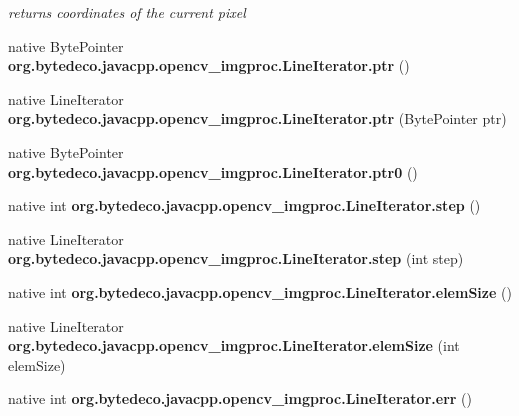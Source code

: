 \begin{DoxyCompactItemize}
\begin{DoxyCompactList}\small\item\em returns coordinates of the current pixel \end{DoxyCompactList}\item 
\mbox{\label{group__imgproc_ga25dc6ab71b5b93e0a3413227e2773826}} 
native Byte\+Pointer {\bfseries org.\+bytedeco.\+javacpp.\+opencv\+\_\+imgproc.\+Line\+Iterator.\+ptr} ()
\item 
\mbox{\label{group__imgproc_ga20f9ec09fb3f6f6ccf40193b347d0f7c}} 
native Line\+Iterator {\bfseries org.\+bytedeco.\+javacpp.\+opencv\+\_\+imgproc.\+Line\+Iterator.\+ptr} (Byte\+Pointer ptr)
\item 
\mbox{\label{group__imgproc_gad943660786a5905e1c46f535e955ef7c}} 
native Byte\+Pointer {\bfseries org.\+bytedeco.\+javacpp.\+opencv\+\_\+imgproc.\+Line\+Iterator.\+ptr0} ()
\item 
\mbox{\label{group__imgproc_gac4e82c4106fb6c949cc7b8beeedc3fe6}} 
native int {\bfseries org.\+bytedeco.\+javacpp.\+opencv\+\_\+imgproc.\+Line\+Iterator.\+step} ()
\item 
\mbox{\label{group__imgproc_ga37f140e72ae2e2263e885394b9f9b34b}} 
native Line\+Iterator {\bfseries org.\+bytedeco.\+javacpp.\+opencv\+\_\+imgproc.\+Line\+Iterator.\+step} (int step)
\item 
\mbox{\label{group__imgproc_gaaa21dc13f40e52f18c1beb09d4d617c0}} 
native int {\bfseries org.\+bytedeco.\+javacpp.\+opencv\+\_\+imgproc.\+Line\+Iterator.\+elem\+Size} ()
\item 
\mbox{\label{group__imgproc_ga00feb3c069b4b6e78be703a6b308ebe7}} 
native Line\+Iterator {\bfseries org.\+bytedeco.\+javacpp.\+opencv\+\_\+imgproc.\+Line\+Iterator.\+elem\+Size} (int elem\+Size)
\item 
\mbox{\label{group__imgproc_ga4a719006f4c64889fd7070f4ec6e4792}} 
native int {\bfseries org.\+bytedeco.\+javacpp.\+opencv\+\_\+imgproc.\+Line\+Iterator.\+err} ()
\item 
\mbox{\label{group__imgproc_ga2d7994d73929a584f419f6904938e3b8}} 

\end{DoxyCompactItemize}
